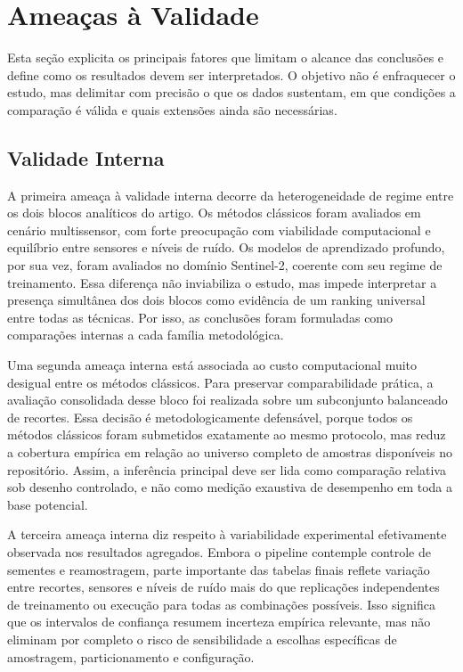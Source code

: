 \section{Ameaças à Validade}
\label{sec:threats}

Esta seção explicita os principais fatores que limitam o alcance das conclusões e define como os resultados devem ser interpretados.
O objetivo não é enfraquecer o estudo, mas delimitar com precisão o que os dados sustentam, em que condições a comparação é válida e quais extensões ainda são necessárias.

\subsection{Validade Interna}

A primeira ameaça à validade interna decorre da heterogeneidade de regime entre os dois blocos analíticos do artigo.
Os métodos clássicos foram avaliados em cenário multissensor, com forte preocupação com viabilidade computacional e equilíbrio entre sensores e níveis de ruído.
Os modelos de aprendizado profundo, por sua vez, foram avaliados no domínio Sentinel-2, coerente com seu regime de treinamento.
Essa diferença não inviabiliza o estudo, mas impede interpretar a presença simultânea dos dois blocos como evidência de um ranking universal entre todas as técnicas.
Por isso, as conclusões foram formuladas como comparações internas a cada família metodológica.

Uma segunda ameaça interna está associada ao custo computacional muito desigual entre os métodos clássicos.
Para preservar comparabilidade prática, a avaliação consolidada desse bloco foi realizada sobre um subconjunto balanceado de recortes.
Essa decisão é metodologicamente defensável, porque todos os métodos clássicos foram submetidos exatamente ao mesmo protocolo, mas reduz a cobertura empírica em relação ao universo completo de amostras disponíveis no repositório.
Assim, a inferência principal deve ser lida como comparação relativa sob desenho controlado, e não como medição exaustiva de desempenho em toda a base potencial.

A terceira ameaça interna diz respeito à variabilidade experimental efetivamente observada nos resultados agregados.
Embora o pipeline contemple controle de sementes e reamostragem, parte importante das tabelas finais reflete variação entre recortes, sensores e níveis de ruído mais do que replicações independentes de treinamento ou execução para todas as combinações possíveis.
Isso significa que os intervalos de confiança resumem incerteza empírica relevante, mas não eliminam por completo o risco de sensibilidade a escolhas específicas de amostragem, particionamento e configuração.

